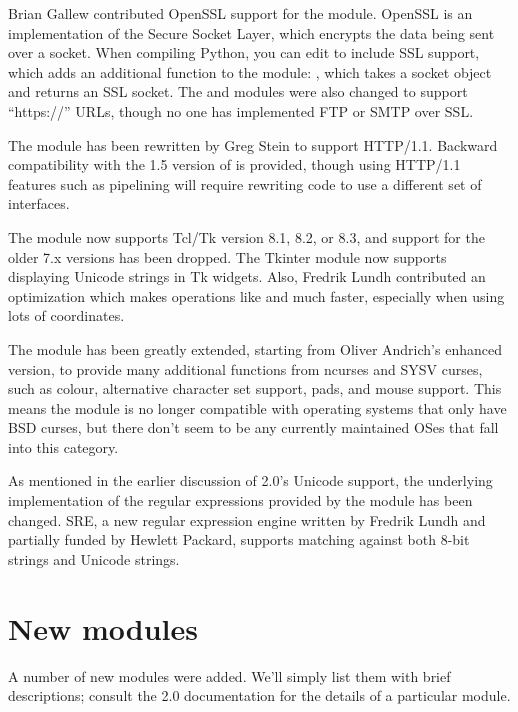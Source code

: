 \documentclass{howto}
\begin{document}
Brian Gallew contributed OpenSSL support for the 
module.  OpenSSL is an implementation of the Secure Socket Layer,
which encrypts the data being sent over a socket.  When compiling
Python, you can edit  to include SSL support,
which adds an additional function to the  module:
,
which takes a socket object and returns an SSL socket.  The
 and  modules were also changed to
support ``https://'' URLs, though no one has implemented FTP or SMTP
over SSL.  

The  module has been rewritten by Greg Stein to
support HTTP/1.1.  Backward compatibility with the 1.5 version of
 is provided, though using HTTP/1.1 features such as
pipelining will require rewriting code to use a different set of
interfaces.

The  module now supports Tcl/Tk version 8.1, 8.2, or
8.3, and support for the older 7.x versions has been dropped.  The
Tkinter module now supports displaying Unicode strings in Tk widgets.
Also, Fredrik Lundh contributed an optimization which makes operations
like  and  much faster,
especially when using lots of coordinates.

The  module has been greatly extended, starting from
Oliver Andrich's enhanced version, to provide many additional
functions from ncurses and SYSV curses, such as colour, alternative
character set support, pads, and mouse support.  This means the module
is no longer compatible with operating systems that only have BSD
curses, but there don't seem to be any currently maintained OSes that
fall into this category.

As mentioned in the earlier discussion of 2.0's Unicode support, the
underlying implementation of the regular expressions provided by the
 module has been changed.  SRE, a new regular expression
engine written by Fredrik Lundh and partially funded by Hewlett
Packard, supports matching against both 8-bit strings and Unicode
strings.

\section{New modules}

A number of new modules were added.  We'll simply list them with brief
descriptions; consult the 2.0 documentation for the details of a
particular module.
\end{document}
